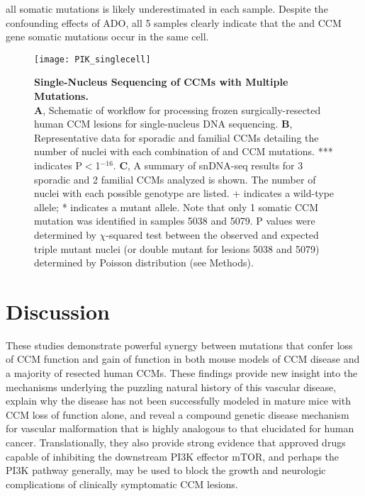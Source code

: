 all somatic mutations is likely underestimated in each sample. Despite the confounding effects of ADO, all 5 samples clearly indicate that the  and CCM gene somatic mutations occur in the same cell.

\begin{figure}[tbp!]
\begin{center}
\texttt{[image: PIK\_singlecell]}
\end{center}
\caption[Single-Nucleus Sequencing of CCMs with Three Pathogenic Mutations.] {\textbf{Single-Nucleus Sequencing of CCMs with Multiple Mutations.} \\ \textbf{A}, Schematic of workflow for processing frozen surgically-resected human CCM lesions for single-nucleus DNA sequencing. \textbf{B}, Representative data for sporadic and familial CCMs detailing the number of nuclei with each combination of  and CCM mutations. *** indicates P$<$1$^{-16}$. \textbf{C}, A summary of snDNA-seq results for 3 sporadic and 2 familial CCMs analyzed is shown. The number of nuclei with each possible genotype are listed. + indicates a wild-type allele; * indicates a mutant allele. Note that only 1 somatic CCM mutation was identified in samples 5038 and 5079. P values were determined by $\chi$-squared test between the observed and expected triple mutant nuclei (or double mutant for lesions 5038 and 5079) determined by Poisson distribution (see Methods).}

\label{PIK_singlecell}
\end{figure}

\section{Discussion}
These studies demonstrate powerful synergy between mutations that confer loss of CCM function and gain of  function in both mouse models of CCM disease and a majority of resected human CCMs. These findings provide new insight into the mechanisms underlying the puzzling natural history of this vascular disease, explain why the disease has not been successfully modeled in mature mice with CCM loss of function alone, and reveal a compound genetic disease mechanism for vascular malformation that is highly analogous to that elucidated for human cancer. Translationally, they also provide strong evidence that approved drugs capable of inhibiting the downstream PI3K effector mTOR, and perhaps the PI3K pathway generally, may be used to block the growth and neurologic complications of clinically symptomatic CCM lesions.  

